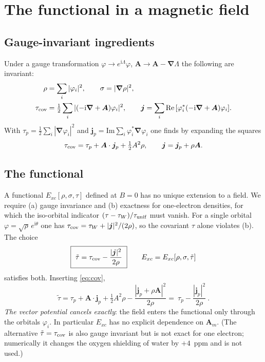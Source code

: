 \documentclass[11pt,a4paper]{article}
\newcommand{\grad}{\bm{\nabla}}
\newcommand{\jp}{\bm{j}_p}
\newcommand{\ttil}{\tilde\tau}
\newcommand{\ci}{\mathrm{i}}
\begin{document}
\section{The functional in a magnetic field}

\subsection{Gauge-invariant ingredients}
Under a gauge transformation $\varphi\to e^{\ci\Lambda}\varphi$, $\bm A\to\bm A-\grad\Lambda$ the following are invariant:
\begin{align}
\rho&=\sum_i|\varphi_i|^2,\qquad \sigma=|\grad\rho|^2,\\
\tau_{\rm cov}&=\tfrac12\sum_i|(-\ci\grad+\bm A)\varphi_i|^2,\qquad
\bm j=\sum_i\mathrm{Re}\,[\varphi_i^*(-\ci\grad+\bm A)\varphi_i] .
\end{align}
With $\tau_p=\tfrac12\sum_i|\grad\varphi_i|^2$ and $\jp=\mathrm{Im}\sum_i\varphi_i^*\grad\varphi_i$ one finds by expanding the squares
\begin{equation}
\tau_{\rm cov}=\tau_p+\bm A\cdot\jp+\tfrac12A^2\rho,\qquad \bm j=\jp+\rho\bm A .
\label{eq:cov}
\end{equation}

\subsection{The functional}
A functional $E_{xc}[\rho,\sigma,\tau]$ defined at $B=0$ has no unique extension to a field. We require (a) gauge invariance and (b) exactness for one-electron densities, for which the iso-orbital indicator $(\tau-\tau_W)/\tau_{\rm unif}$ must vanish. For a single orbital $\varphi=\sqrt\rho\,e^{\ci\theta}$ one has $\tau_{\rm cov}=\tau_W+|\bm j|^2/(2\rho)$, so the covariant $\tau$ alone violates (b). The choice
\begin{equation}
\boxed{\ \ttil=\tau_{\rm cov}-\frac{|\bm j|^2}{2\rho}\ }\qquad E_{xc}=E_{xc}[\rho,\sigma,\ttil]
\end{equation}
satisfies both. Inserting \eqref{eq:cov},
\begin{equation}
\ttil=\tau_p+\bm A\cdot\jp+\tfrac12A^2\rho-\frac{|\jp+\rho\bm A|^2}{2\rho}
=\boxed{\ \tau_p-\frac{|\jp|^2}{2\rho}\ } .
\label{eq:tt}
\end{equation}
\emph{The vector potential cancels exactly}: the field enters the functional only through the orbitals $\varphi_i$. In particular $E_{xc}$ has no explicit dependence on $\bm A_m$. (The alternative $\ttil=\tau_{\rm cov}$ is also gauge invariant but is not exact for one electron; numerically it changes the oxygen shielding of water by $+4$~ppm and is not used.)
\end{document}
